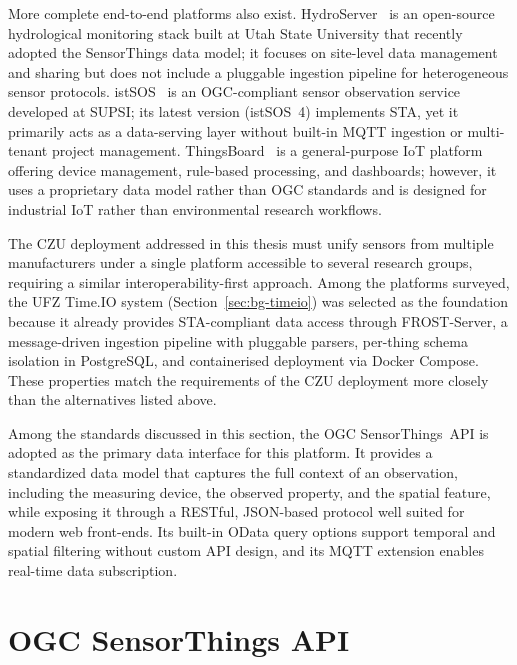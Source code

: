 More complete end-to-end platforms also exist. HydroServer~\cite{horsburgh2025hydroserver}
is an open-source hydrological monitoring stack built at Utah State University
that recently adopted the SensorThings data model; it focuses on site-level
data management and sharing but does not include a pluggable ingestion pipeline
for heterogeneous sensor protocols. istSOS~\cite{cannata2018istsos} is an
OGC-compliant sensor observation service developed at SUPSI; its latest version
(istSOS~4) implements STA, yet it primarily acts as a data-serving layer
without built-in MQTT ingestion or multi-tenant project management.
ThingsBoard~\cite{thingsboard} is a general-purpose IoT platform offering
device management, rule-based processing, and dashboards; however, it uses a
proprietary data model rather than OGC standards and is designed for industrial
IoT rather than environmental research workflows.

The CZU deployment addressed in this thesis must unify sensors from multiple manufacturers
under a single platform accessible to several research groups, requiring a similar
interoperability-first approach. Among the platforms surveyed, the UFZ Time.IO system
(Section~\ref{sec:bg-timeio}) was selected as the foundation because it already
provides STA-compliant data access through FROST-Server, a message-driven
ingestion pipeline with pluggable parsers, per-thing schema isolation in
PostgreSQL, and containerised deployment via Docker Compose. These properties
match the requirements of the CZU deployment more closely than the alternatives
listed above.

Among the standards discussed in this section, the OGC SensorThings~API is adopted as the
primary data interface for this platform. It provides a standardized data model that
captures the full context of an observation, including the measuring device, the observed
property, and the spatial feature, while exposing it through a RESTful, JSON-based protocol
well suited for modern web front-ends. Its built-in OData query options support temporal
and spatial filtering without custom API design, and its MQTT extension enables real-time
data subscription.

\section{OGC SensorThings API}
\label{sec:bg-sta}

